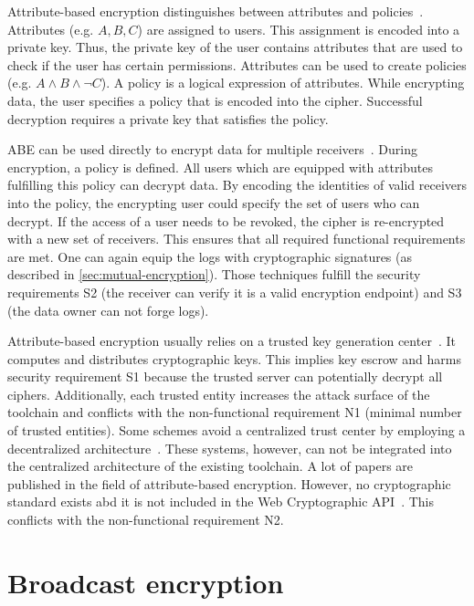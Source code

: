 \documentclass[../main.tex]{subfiles}
\begin{document}
Attribute-based encryption distinguishes between attributes and policies~\cite{Bethencourt2007}.
Attributes (e.g. ${A,B,C}$) are assigned to users.
This assignment is encoded into a private key.
Thus, the private key of the user contains attributes that are used to check if the user has certain permissions.
Attributes can be used to create policies (e.g. $A \land B \land \neg C$).
A policy is a logical expression of attributes.
While encrypting data, the user specifies a policy that is encoded into the cipher.
Successful decryption requires a private key that satisfies the policy.

ABE can be used directly to encrypt data for multiple receivers~\cite{Bethencourt2007}. 
During encryption, a policy is defined. 
All users which are equipped with attributes fulfilling this policy can decrypt data.
By encoding the identities of valid receivers into the policy, the encrypting user could specify the set of users who can decrypt.
If the access of a user needs to be revoked, the cipher is re-encrypted with a new set of receivers.
This ensures that all required functional requirements are met.
One can again equip the logs with cryptographic signatures (as described in \cref{sec:mutual-encryption}).
Those techniques fulfill the security requirements S2 (the receiver can verify it is a valid encryption endpoint) and S3 (the data owner can not forge logs).

Attribute-based encryption usually relies on a trusted key generation center~\cite{Sahai2009}.
It computes and distributes cryptographic keys.
This implies key escrow and harms security requirement S1 because the trusted server can potentially decrypt all ciphers.
Additionally, each trusted entity increases the attack surface of the toolchain and conflicts with the non-functional requirement N1 (minimal number of trusted entities).
Some schemes avoid a centralized trust center by employing a decentralized architecture~\cite{Vaanchig2018}.
These systems, however, can not be integrated into the centralized architecture of the existing toolchain.
A lot of papers are published in the field of attribute-based encryption.
However, no cryptographic standard exists abd it is not included in the Web Cryptographic API~\cite{WebCryptoApi2017}.
This conflicts with the non-functional requirement N2.

\section{Broadcast encryption}
\label{sec:broadcast-encryption}
\end{document}
